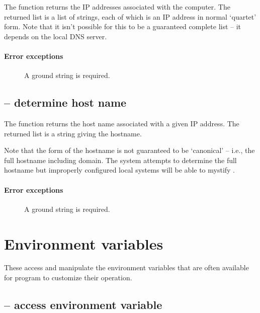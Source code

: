 
The  function returns the IP addresses associated with the  computer. The returned list is a list of strings, each of which is an IP address in normal `quartet' form. Note that it isn't possible for this to be a guaranteed complete list -- it depends on the local DNS server.

\paragraph{Error exceptions}
\begin{description}
\item[]
A ground string is required.
\end{description}


\subsection{ -- determine host name}
\label{misc:iptohost}


The  function returns the host name associated with a given IP address. The returned list is a string giving the hostname.

Note that the form of the hostname is not guaranteed to be `canonical' -- i.e., the full hostname including domain. The \go system attempts to determine the full hostname but improperly configured local systems will be able to mystify \go.

\paragraph{Error exceptions}
\begin{description}
\item[]
A ground string is required.
\end{description}

\section{Environment variables}
\label{misc:environment}

These access and manipulate the environment variables that are often available for program to customize their operation.

\subsection{ -- access environment variable}
\label{misc:getenv}

